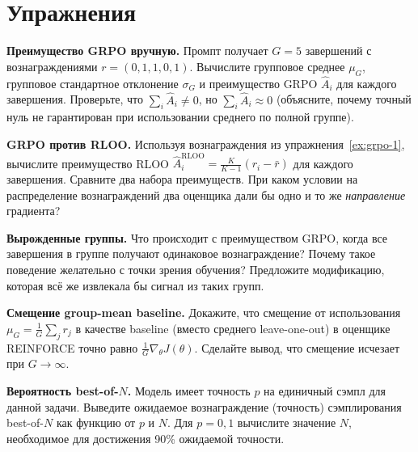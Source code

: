 \section*{Упражнения}

\begin{exercise}
\label{ex:grpo-1}
\textbf{Преимущество GRPO вручную.} Промпт получает $G = 5$ завершений с вознаграждениями $r = (0, 1, 1, 0, 1)$. Вычислите групповое среднее $\mu_G$, групповое стандартное отклонение $\sigma_G$ и преимущество GRPO $\hat{A}_i$ для каждого завершения. Проверьте, что $\sum_i \hat{A}_i \neq 0$, но $\sum_i \hat{A}_i \approx 0$ (объясните, почему точный нуль не гарантирован при использовании среднего по полной группе).
\end{exercise}

\begin{exercise}
\label{ex:grpo-2}
\textbf{GRPO против RLOO.} Используя вознаграждения из упражнения~\ref{ex:grpo-1}, вычислите преимущество RLOO $\hat{A}_i^{\mathrm{RLOO}} = \frac{K}{K-1}(r_i - \bar{r})$ для каждого завершения. Сравните два набора преимуществ. При каком условии на распределение вознаграждений два оценщика дали бы одно и то же \emph{направление} градиента?
\end{exercise}

\begin{exercise}
\label{ex:grpo-3}
\textbf{Вырожденные группы.} Что происходит с преимуществом GRPO, когда все завершения в группе получают одинаковое вознаграждение? Почему такое поведение желательно с точки зрения обучения? Предложите модификацию, которая всё же извлекала бы сигнал из таких групп.
\end{exercise}

\begin{exercise}
\label{ex:grpo-4}
\textbf{Смещение group-mean baseline.} Докажите, что смещение от использования $\mu_G = \frac{1}{G}\sum_j r_j$ в качестве baseline (вместо среднего leave-one-out) в оценщике REINFORCE точно равно $\frac{1}{G}\nabla_\theta J(\theta)$. Сделайте вывод, что смещение исчезает при $G \to \infty$.
\end{exercise}

\begin{exercise}
\label{ex:grpo-5}
\textbf{Вероятность best-of-$N$.} Модель имеет точность $p$ на единичный сэмпл для данной задачи. Выведите ожидаемое вознаграждение (точность) сэмплирования best-of-$N$ как функцию от $p$ и $N$. Для $p = 0{,}1$ вычислите значение $N$, необходимое для достижения 90\% ожидаемой точности.
\end{exercise}

